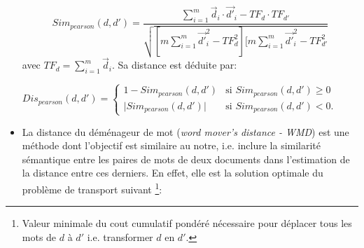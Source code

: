 \begin{itemize}
	\[Sim_{pearson}(d,d') = \frac{ \sum\limits^m_{i=1} \vec{d}_i \cdot \vec{d'}_i - TF_d\cdot TF_{d'}}{\sqrt{[m \sum\limits^m_{i=1} \vec{d'}_i^2 - TF^2_d][m \sum\limits^m_{i=1} \vec{d'}_i^2 - TF^2_{d'}}}\]
avec $TF_d = \sum\limits^m_{i=1} \vec{d}_i$. Sa distance est déduite par:

$Dis_{pearson}(d,d') =
\left\{ \begin{array}{ll}
1 - Sim_{pearson}(d,d') & \text{si } Sim_{pearson}(d,d') \geq 0 \\
\vert Sim_{pearson}(d,d') \vert & \text{si } Sim_{pearson}(d,d') < 0.
\end{array}
\right.$
	\item \og La distance du déménageur de mot \fg{} (\textit{word mover's distance - WMD}) \citep{kusner2015wordmoverdist} est une méthode dont l'objectif est similaire au notre, i.e. inclure la similarité sémantique entre les paires de mots de deux documents dans l'estimation de la distance entre ces derniers. En effet, elle est la solution optimale du problème de transport suivant \footnote{Valeur minimale du cout cumulatif pondéré nécessaire pour déplacer  tous les mots de $d$ à $d'$ i.e. transformer $d$ en $d'$.}:
	

\end{itemize}
